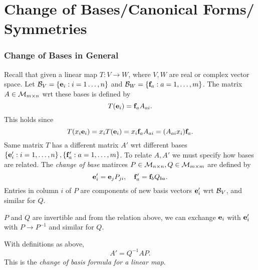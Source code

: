 \documentclass[10pt]{article}
\begin{document}
    \part{Change of Bases/Canonical Forms/\\Symmetries}
    \section{Change of Bases in General}
    Recall that given a linear map $ T: V \to W $, where $V,W$ are real or complex vector space. Let $ {\mathcal{B}}_V=\left\{ {\bf e}_i:i=1\dots,n \right\} $ and $ {\mathcal{B}}_W=\left\{ {\bf f}_a:a=1,\dots,m \right\} $. The matrix $A\in {\mathcal{M}}_{m\times n}$ wrt these bases is defined by 
    \[
        T({\bf e}_i)={\bf f}_a A_{ai}.
    \] 
    This holds since
    \[
        T(x_i{\bf e}_i)=x_iT({\bf e}_i)=x_i{\bf f}_aA_{ai}=(A_{ai}x_i){\bf f}_a.
    \]
    Same matrix $T$ has a different matrix $A'$ wrt different bases $ \left\{ {\bf e}_i':i=1,\dots,n \right\}, \{{\bf f}_a':a=1,\dots,m\} $. To relate $A,A'$ we must specify how bases are related. The \textit{change of base} matirces $P\in {\mathcal{M}}_{n\times n}, Q\in {\mathcal{M}}_{m\times m}$ are defined by 
    \[
        {\bf e}_i'={\bf e}_jP_{ji}, \quad {\bf f}_a'={\bf f}_bQ_{ba}.
    \]
    Entries in column $i$ of $P$ are components of new basis vectors ${\bf e}_i'$ wrt ${\mathcal{B}}_V$, and similar for $Q$.
    \begin{remark}
        $P$ and $Q$ are invertible and from the relation above, we can exchange ${\bf e}_i$ with ${\bf e}_i'$ with $ P\to P^{-1} $ and similar for $Q$.
    \end{remark}
    \begin{proposition}
        With definitions as above,
        \[
            A'=Q^{-1}AP.
        \]
        This is the \textit{change of basis formula for a linear map}.
    \end{proposition}
\end{document}
